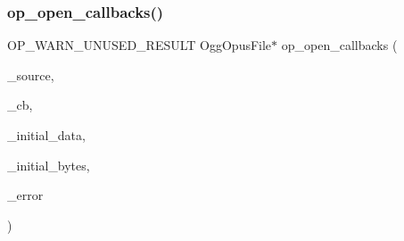 \subsubsection{\texorpdfstring{op\+\_\+open\+\_\+callbacks()}{op\_open\_callbacks()}}
{\footnotesize\ttfamily O\+P\+\_\+\+W\+A\+R\+N\+\_\+\+U\+N\+U\+S\+E\+D\+\_\+\+R\+E\+S\+U\+LT Ogg\+Opus\+File$\ast$ op\+\_\+open\+\_\+callbacks (\begin{DoxyParamCaption}\item[{\hyperlink{png_8h_ac9c84fa68bbad002983e35ce3663c686}{void} $\ast$}]{\+\_\+source,  }\item[{\hyperlink{zconf_8h_a2c212835823e3c54a8ab6d95c652660e}{const} \hyperlink{struct_opus_file_callbacks}{Opus\+File\+Callbacks} $\ast$}]{\+\_\+cb,  }\item[{\hyperlink{zconf_8h_a2c212835823e3c54a8ab6d95c652660e}{const} unsigned char $\ast$}]{\+\_\+initial\+\_\+data,  }\item[{size\+\_\+t}]{\+\_\+initial\+\_\+bytes,  }\item[{int $\ast$}]{\+\_\+error }\end{DoxyParamCaption})}

